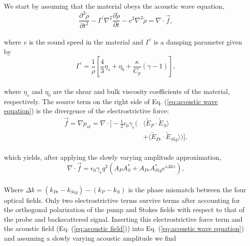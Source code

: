 \documentclass[
sn-nature,
twocolumn
]{sn-jnl}%
\begin{document}
\begin{appendices}
We start by assuming that the material obeys the acoustic wave equation,
\\
\begin{equation}
    \frac{\partial^{2}\tilde{\rho}}{\partial t^{2}} - \Gamma^{\prime}\nabla^{2}\frac{\partial\tilde{\rho}}{\partial t} - v^{2}\nabla^{2}\tilde{\rho} = \nabla\cdot\vec{f},
    \label{eq:acoustic wave equation}
\end{equation}
\\
\noindent where $v$ is the sound speed in the material and $\Gamma^{\prime}$ is a damping parameter given by
\\
\begin{equation}
    \Gamma^{\prime} = \frac{1}{\rho}\left[\frac{4}{3}\eta_{s} + \eta_{b} + \frac{\kappa}{C_{p}}(\gamma - 1)\right],
\end{equation}
\\
\noindent where $\eta_{s}$ and $\eta_{b}$ are the shear and bulk viscosity coefficients of the material, respectively. The source term on the right side of Eq. (\ref{eq:acoustic wave equation}) is the divergence of the electrostrictive force:
\\
\begin{equation}
\begin{split}
    \vec{f} = \nabla p_{st} = \nabla \cdot \Bigg[-\frac{1}{2}\epsilon_{0}\gamma_{e}\Big(&\langle\tilde{E}_{P} \cdot \tilde{E}_{S}\rangle \\
    &+ \langle\tilde{E}_{Pr} \cdot \tilde{E}_{Sig}\rangle\Big)\Bigg],
\end{split}
\end{equation}
\\
which yields, after applying the slowly varying amplitude approximation,
\\
\begin{equation}
    \nabla\cdot\vec{f} = \epsilon_{0}\gamma_{e}q^{2}(A_{P}A_{S}^{*} + A_{Pr}A_{Sig}^{*}e^{i\Delta kz}),
\end{equation}
\\
Where $\Delta k = (k_{Pr} - k_{Sig}) - (k_{P} - k_{S})$ is the phase mismatch between the four optical fields. Only two electrostrictive terms survive terms after accounting for the orthogonal polarization of the pump and Stokes fields with respect to that of the probe and backscattered signal. Inserting this electrostrictive force term and the acoustic field (Eq. (\ref{eq:acoustic field})) into Eq. (\ref{eq:acoustic wave equation}) and assuming a slowly varying acoustic amplitude we find
\\

\end{appendices}
\end{document}
